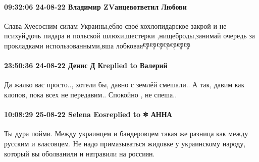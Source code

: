\paragraph{09:32:06 24-08-22 Владимир ZVанцевответил Любови}

Слава Хуесосним силам Украины,ебло своё хохлопидарское закрой и не психуй,дочь
пидара и польской шлюхи,шестерки ,нищеброды,занимай очередь за прокладками
использованными,вша лобковая👎👎👎👎👎👎👎

\paragraph{23:50:36 24-08-22 Денис Д Кreplied to Валерий}

Да жалко вас просто.., хотели бы, давно с землёй смешали.. А так, давим как
клопов, пока всех не передавим.. Спокойно , не спеша..

\paragraph{10:08:29 25-08-22 Selena Eosreplied to 🔯 АННА}

Ты дура пойми. Между украинцем и бандеровцем такая же разница как между русским
и власовцем. Не надо примазываться жидовке у украинскому народу, который вы
оболванили и натравили на россиян.


